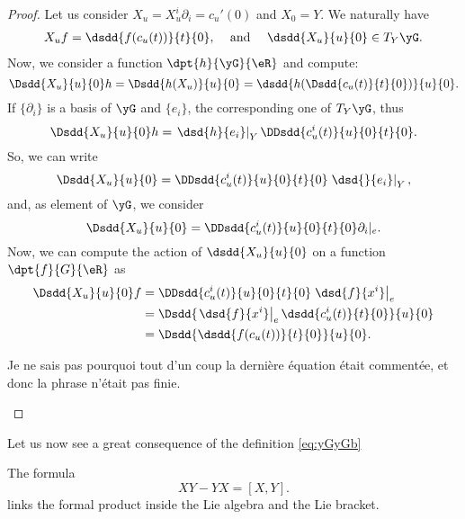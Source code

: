 \begin{proof}
	Let us consider $X_u=X_u^i\partial_i=c_u'(0)$ and $X_0=Y$. We naturally have
	\begin{align}
		X_uf & =\dsdd{f(c_u(t))}{t}{0}, & \text{ and } &  & \dsdd{X_u}{u}{0}\in T_Y\yG.
	\end{align}
	Now, we consider a function $\dpt{h}{\yG}{\eR}$ and compute:
	\[
		\Dsdd{X_u}{u}{0}h=\Dsdd{h(X_u)}{u}{0}
		=\dsdd{ h(\Dsdd{c_u(t)}{t}{0}) }{u}{0}.
	\]
	If $\{\partial_i\}$ is a basis of $\yG$ and $\{e_i\}$, the corresponding one of $T_Y\yG$, thus
	\begin{equation}
		\Dsdd{X_u}{u}{0}h=\left.\dsd{h}{e_i}\right|_Y\DDsdd{c^i_u(t)}{u}{0}{t}{0}.
	\end{equation}
	So, we can write
	\[
		\Dsdd{X_u}{u}{0}=\DDsdd{c^i_u(t)}{u}{0}{t}{0}\left.\dsd{}{e_i}\right|_Y,
	\]
	and, as element of $\yG$, we consider
	\[
		\Dsdd{X_u}{u}{0}=\DDsdd{ c^i_u(t) }{u}{0}{t}{0}\partial_i|_e.
	\]
	Now, we can compute the action of $\dsdd{X_u}{u}{0}$ on a function $\dpt{f}{G}{\eR}$ as
	\begin{equation}
		\begin{split}
			\Dsdd{X_u}{u}{0}f&=\DDsdd{c^i_u(t)}{u}{0}{t}{0}\left.\dsd{f}{x^i}\right|_e\\
			&=\Dsdd{ \left.\dsd{f}{x^i}\right|_e\dsdd{c^i_u(t)}{t}{0}  }{u}{0}\\
			&=\Dsdd{ \dsdd{f(c_u(t))}{t}{0} }{u}{0}.
		\end{split}
	\end{equation}
	\begin{probleme}
		Je ne sais pas pourquoi tout d'un coup la dernière équation était commentée, et donc la phrase n'était pas finie.
	\end{probleme}

\end{proof}

Let us now see a great consequence of the definition \eqref{eq:yGyGb}
\begin{proposition} \label{prop:XY_YX}
	The formula
	\begin{equation}
		XY-YX=[X,Y].
	\end{equation}
	links the formal product inside the Lie algebra and the Lie bracket.
\end{proposition}

